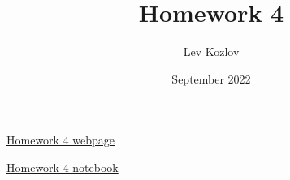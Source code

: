 \documentclass{article}
\title{Homework 4}
\author{Lev Kozlov}
\date{September 2022}
\begin{document}
\maketitle

\href{https://lvjonok.github.io/f22-theoretical-mechanics/2022/09/28/homework4.html}{Homework 4 webpage}

\href{https://github.com/lvjonok/f22-theoretical-mechanics/blob/master/homework4/main.ipynb}{Homework 4 notebook}




\newpage


\end{document}
